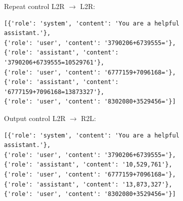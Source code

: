 \documentclass{article}
\theoremstyle{plain}
\theoremstyle{definition}
\theoremstyle{remark}
\begin{document}
\begin{figure}[H]
Repeat control L2R $\rightarrow$ L2R:
    \begin{verbatim}
[{'role': 'system', 'content': 'You are a helpful assistant.'}, 
{'role': 'user', 'content': '3790206+6739555='}, 
{'role': 'assistant', 'content': '3790206+6739555=10529761'}, 
{'role': 'user', 'content': '6777159+7096168='}, 
{'role': 'assistant', 'content': '6777159+7096168=13873327'}, 
{'role': 'user', 'content': '8302080+3529456='}]
\end{verbatim}
\end{figure}

\begin{figure}[H]
Output control L2R $\rightarrow$ R2L:
    \begin{verbatim}
[{'role': 'system', 'content': 'You are a helpful assistant.'}, 
{'role': 'user', 'content': '3790206+6739555='}, 
{'role': 'assistant', 'content': '10,529,761'}, 
{'role': 'user', 'content': '6777159+7096168='}, 
{'role': 'assistant', 'content': '13,873,327'}, 
{'role': 'user', 'content': '8302080+3529456='}]
\end{verbatim}
\end{figure}
\end{document}
